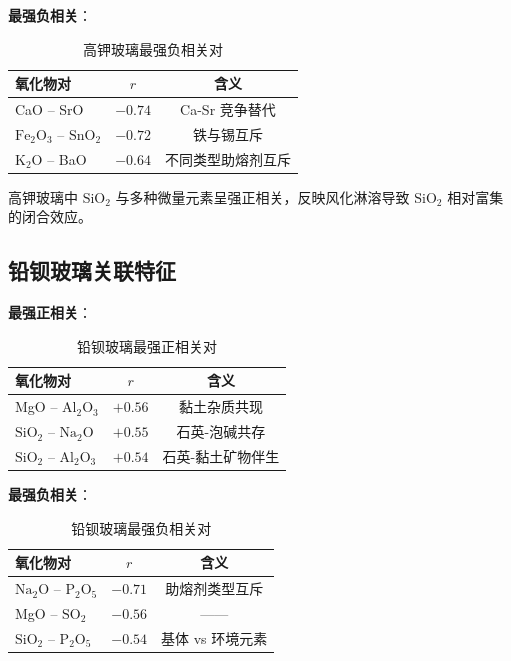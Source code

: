 \textbf{最强负相关}：

\begin{table}[H]
    \centering
    \caption{高钾玻璃最强负相关对}
    \label{tab:hk_neg_corr}
    \begin{tabular}{l c c}
        \toprule
        \textbf{氧化物对} & \textbf{$r$} & \textbf{含义} \\
        \midrule
        CaO -- SrO & $-0.74$ & Ca-Sr 竞争替代 \\
        $\text{Fe}_2\text{O}_3$ -- $\text{SnO}_2$ & $-0.72$ & 铁与锡互斥 \\
        $\text{K}_2\text{O}$ -- BaO & $-0.64$ & 不同类型助熔剂互斥 \\
        \bottomrule
    \end{tabular}
\end{table}

高钾玻璃中 $\text{SiO}_2$ 与多种微量元素呈强正相关，反映风化淋溶导致 $\text{SiO}_2$ 相对富集的闭合效应。

\subsection{铅钡玻璃关联特征}

\textbf{最强正相关}：

\begin{table}[H]
    \centering
    \caption{铅钡玻璃最强正相关对}
    \label{tab:pb_pos_corr}
    \begin{tabular}{l c c}
        \toprule
        \textbf{氧化物对} & \textbf{$r$} & \textbf{含义} \\
        \midrule
        MgO -- $\text{Al}_2\text{O}_3$ & $+0.56$ & 黏土杂质共现 \\
        $\text{SiO}_2$ -- $\text{Na}_2\text{O}$ & $+0.55$ & 石英-泡碱共存 \\
        $\text{SiO}_2$ -- $\text{Al}_2\text{O}_3$ & $+0.54$ & 石英-黏土矿物伴生 \\
        \bottomrule
    \end{tabular}
\end{table}

\textbf{最强负相关}：

\begin{table}[H]
    \centering
    \caption{铅钡玻璃最强负相关对}
    \label{tab:pb_neg_corr}
    \begin{tabular}{l c c}
        \toprule
        \textbf{氧化物对} & \textbf{$r$} & \textbf{含义} \\
        \midrule
        $\text{Na}_2\text{O}$ -- $\text{P}_2\text{O}_5$ & $-0.71$ & 助熔剂类型互斥 \\
        MgO -- $\text{SO}_2$ & $-0.56$ & —— \\
        $\text{SiO}_2$ -- $\text{P}_2\text{O}_5$ & $-0.54$ & 基体 vs 环境元素 \\
        \bottomrule
    \end{tabular}
\end{table}

